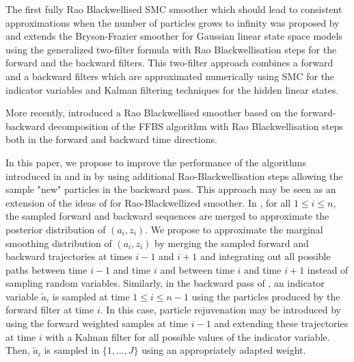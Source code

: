 The first fully Rao Blackwellised SMC smoother which should lead to consistent approximations when the number of particles grows to infinity was proposed by  \cite{briers:doucet:maskell:2010} and extends the Bryson-Frazier smoother for Gaussian linear state space models using the generalized two-filter formula with Rao Blackwellisation steps for the forward and the backward filters.  This two-filter approach combines a forward and a backward filters which are approximated numerically using SMC for the indicator variables and Kalman filtering techniques for the hidden linear states.

More recently, \cite{lindsten:bunch:sarkka:schon:godsill:2015,sarkka:bunch:godsill:2012,lindsten:bunch:godsill:schon:2013} introduced a Rao Blackwellised smoother based on the forward-backward decomposition of the FFBS algorithm with Rao Blackwellisation steps both in the forward and backward time directions.

In this paper, we propose to improve the performance of the algorithms introduced in \cite{briers:doucet:maskell:2010} and in \cite{lindsten:bunch:sarkka:schon:godsill:2015,sarkka:bunch:godsill:2012,lindsten:bunch:godsill:schon:2013} by using additional Rao-Blackwellisation steps allowing the sample "new" particles in the backward pass. This approach may be seen as an extension of the ideas of \cite{fearnhead:clifford:2003} for Rao-Blackwellized smoother.  In \cite{briers:doucet:maskell:2010}, for all $1\le i\le n$, the sampled forward and backward sequences are merged to approximate the posterior distribution of $(a_i,z_i)$. We propose to approximate the marginal smoothing distribution of $(a_i,z_i)$ by merging the sampled forward and backward trajectories at times $i-1$ and $i+1$ and integrating out all possible paths between time $i-1$ and time $i$ and between time $i$ and time $i+1$ instead of sampling random variables. Similarly, in the backward pass of \cite{lindsten:bunch:sarkka:schon:godsill:2015,sarkka:bunch:godsill:2012,lindsten:bunch:godsill:schon:2013}, an indicator variable $\tilde{a}_i$ is sampled at time $1\le i\le n-1$ using the particles produced by the forward filter at time $i$. In this case, particle rejuvenation may be introduced by using the forward weighted samples at time $i-1$ and extending these trajectories at time $i$ with a Kalman filter for all possible values of the indicator variable. Then, $\tilde{a}_i$ is sampled in $\{1,\ldots,J\}$ using an appropriately adapted weight.

